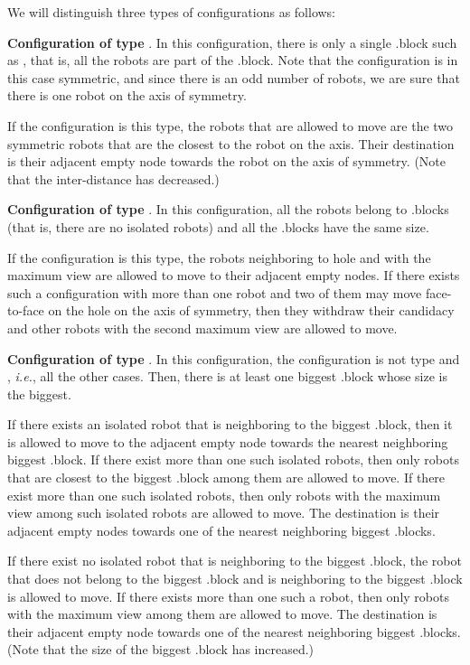\documentclass[11pt]{article}
\begin{document}
We will distinguish three types of configurations as follows:
\begin{itemize*}
\item \textbf{Configuration of type }.
In this configuration, there is only a single .block such as , that is, all the robots are part of the .block. 
Note that the configuration is in this case symmetric, and since there is an odd number of robots, we are sure that there is one robot on the axis of symmetry.

If the configuration is this type, the robots that are allowed to move are the two symmetric robots that are the closest to the robot on the axis. 
Their destination is their adjacent empty node towards the robot on the axis of symmetry.
(Note that the inter-distance has decreased.)

\item \textbf{Configuration of type }.
In this configuration, all the robots belong to .blocks (that is, there are no isolated robots) and all the .blocks have the same size.

If the configuration is this type, the robots neighboring to hole and with the maximum view are allowed to move to their adjacent empty nodes.
If there exists such a configuration with more than one robot and two of them may move face-to-face on the hole on the axis of symmetry, then they withdraw their candidacy and other robots with the second maximum view are allowed to move.

\item \textbf{Configuration of type }.
In this configuration, the configuration is not type  and , \textit{i.e.}, all the other cases.
Then, there is at least one biggest .block whose size is the biggest.

\begin{itemize*}
 \item If there exists an isolated robot that is neighboring to the biggest .block, then it is allowed to move to the adjacent empty node towards the nearest neighboring biggest .block. 
 If there exist more than one such isolated robots, then only robots that are closest to the biggest .block among them are allowed to move.
 If there exist more than one such isolated robots, then only robots with the maximum view among such isolated robots are allowed to move.
The destination is their adjacent empty nodes towards one of the nearest neighboring biggest .blocks.
\item If there exist no isolated robot that is neighboring to the biggest .block, the robot that does not belong to the biggest .block and is neighboring to the biggest .block is allowed to move.
If there exists more than one such a robot, then only robots with the maximum view among them are allowed to move.
The destination is their adjacent empty node towards one of the nearest neighboring biggest .blocks.
(Note that the size of the biggest .block has increased.)\end{itemize*}
\end{itemize*} 
\end{document}
